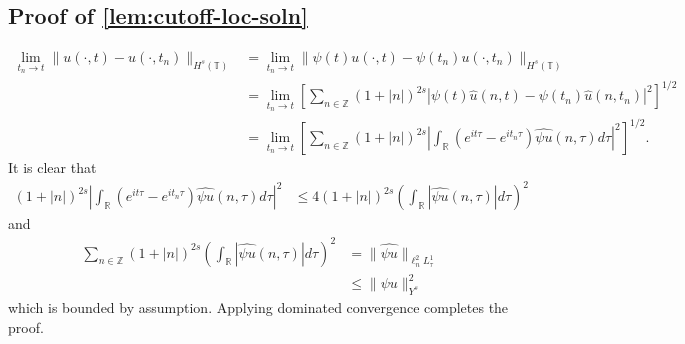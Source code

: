 \documentclass[12pt,reqno]{amsart}
\numberwithin{equation}{section}  %
\numberwithin{figure}{section}
\newcommand{\rr}{\mathbb{R}}
\newcommand{\zz}{\mathbb{Z}}
\newcommand{\ci}{\mathbb{T}}
\newcommand{\wh}{\widehat}
\theoremstyle{plain}
\theoremstyle{definition}
\theoremstyle{remark}
\begin{document}
\section{}
\subsection{Proof of \autoref{lem:cutoff-loc-soln}}
%
%
\begin{equation*}
	\begin{split}
		\lim_{t_{n} \to t} \|u(\cdot, t) - u(\cdot, t_{n})\|_{H^s(\ci)} 
		& = \lim_{t_{n} \to t} \|\psi(t) u(\cdot, t) - \psi(t_n) u(\cdot, t_{n})\|_{H^s(\ci)} 
		\\
		& = \lim_{t_n \to t} \left[ \sum_{n \in \zz}\left( 1 + | n |
		\right)^{2s} | \psi(t)  \wh{u}(n, t) - \psi(t_n) \wh{ u}(n, t_n) |^2 \right]^{1/2}
		\\
		& = \lim_{t_n \to t} \left[ \sum_{n \in \zz} \left( 1 + | n |
		\right)^{2s} | \int_{\rr} (e^{it \tau} - e^{it_{n} \tau}) \wh{\psi u}(n,
		\tau) d \tau |^2 \right]^{1/2}.
	\end{split}
\end{equation*}
		It is clear that
		\begin{equation*}
			\begin{split}
				\left( 1 + | n |
				\right)^{2s} | \int_{\rr} (e^{it \tau} - e^{it_{n}\tau}) \wh{\psi u}(n, \tau) d \tau |^2 
		& \le 4  \left( 1 + | n |
		\right)^{2s} \left ( \int_{\rr} |\wh{\psi u}(n, \tau)| d \tau
		\right )^2 
	\end{split}
\end{equation*}
and 
%
%
\begin{equation*}
	\begin{split}
 \sum_{n \in \zz} \left( 1 + | n |
		\right)^{2s} \left ( \int_{\rr} |\wh{\psi u}(n, \tau)| d \tau
		\right ) ^2 
		& = \|\wh{\psi u}\|_{\ell_{n}^2 L^{1}_{\tau}}
		\\
		& \le \|\psi u \|_{Y^s}^2 
	\end{split}
\end{equation*}
which is bounded by assumption.
Applying dominated convergence completes the proof. \qquad \qedsymbol
%
%
%
%
%
\end{document}
